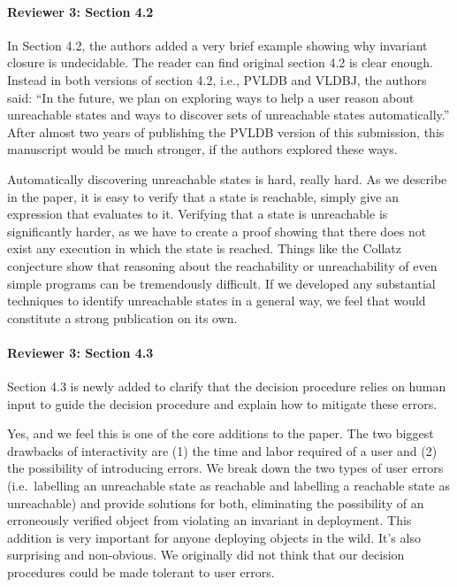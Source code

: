 \documentclass[9pt]{article}
\begin{document}
\begin{multicols*}{2}
\paragraph{Reviewer 3: Section 4.2}
\begin{feedback}
  In Section 4.2, the authors added a very brief example showing why invariant
  closure is undecidable. The reader can find original section 4.2 is clear
  enough. Instead in both versions of section 4.2, i.e., PVLDB and VLDBJ, the
  authors said: ``In the future, we plan on exploring ways to help a user
  reason about unreachable states and ways to discover sets of unreachable
  states automatically.'' After almost two years of publishing the PVLDB
  version of this submission, this manuscript would be much stronger, if the
  authors explored these ways.
\end{feedback}
Automatically discovering unreachable states is hard, really hard. As we
describe in the paper, it is easy to verify that a state is reachable, simply
give an expression that evaluates to it. Verifying that a state is unreachable
is significantly harder, as we have to create a proof showing that there does
not exist any execution in which the state is reached. Things like the Collatz
conjecture show that reasoning about the reachability or unreachability of even
simple programs can be tremendously difficult. If we developed any substantial
techniques to identify unreachable states in a general way, we feel that would
constitute a strong publication on its own.

\paragraph{Reviewer 3: Section 4.3}
\begin{feedback}
  Section 4.3 is newly added to clarify that the decision procedure relies on
  human input to guide the decision procedure and explain how to mitigate these
  errors.
\end{feedback}
Yes, and we feel this is one of the core additions to the paper. The two
biggest drawbacks of interactivity are (1) the time and labor required of a
user and (2) the possibility of introducing errors. We break down the two types
of user errors (i.e.\ labelling an unreachable state as reachable and labelling
a reachable state as unreachable) and provide solutions for both, eliminating
the possibility of an erroneously verified \invariantconfluent{} object from
violating an invariant in deployment. This addition is very important for
anyone deploying \invariantconfluent{} objects in the wild. It's also
surprising and non-obvious. We originally did not think that our decision
procedures could be made tolerant to user errors.


\end{multicols*}
\end{document}
